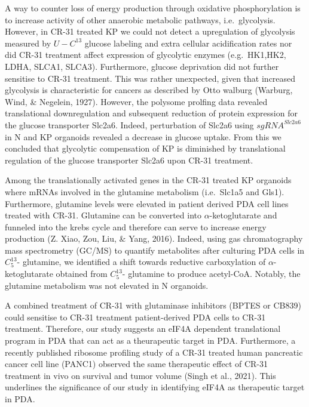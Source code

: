 \documentclass[
  12pt,
  openany]{book}
\begin{document}
A way to counter loss of energy production through oxidative phosphorylation is to increase activity of other anaerobic metabolic pathways, i.e.~glycolysis. However, in CR-31 treated KP we could not detect a upregulation of glycolysis measured by \(U-C^{13}\) glucose labeling and extra cellular acidification rates nor did CR-31 treatment affect expression of glycolytic enzymes (e.g.~HK1,HK2, LDHA, SLCA1, SLCA3). Furthermore, glucose deprivation did not further sensitise to CR-31 treatment. This was rather unexpected, given that increased glycolysis is characteristic for cancers as described by Otto walburg (Warburg, Wind, \& Negelein, 1927). However, the polysome prolfing data revealed translational downregulation and subsequent reduction of protein expression for the glucose transporter Slc2a6. Indeed, perturbation of Slc2a6 using \(sgRNA^{Slc2a6}\) in N and KP organoids revealed a decrease in glucose uptake. From this we concluded that glycolytic compensation of KP is diminished by translational regulation of the glucose transporter Slc2a6 upon CR-31 treatment.

Among the translationally activated genes in the CR-31 treated KP organoids where mRNAs involved in the glutamine metabolism (i.e.~Slc1a5 and Gls1). Furthermore, glutamine levels were elevated in patient derived PDA cell lines treated with CR-31. Glutamine can be converted into \(\alpha\)-ketoglutarate and funneled into the krebs cycle and therefore can serve to increase energy production (Z. Xiao, Zou, Liu, \& Yang, 2016). Indeed, using gas chromatography mass spectrometry (GC/MS) to quantify metabolites after culturing PDA cells in \(C_5^{13}\)- glutamine, we identified a shift towards reductive carboxylation of \(\alpha\)-ketoglutarate obtained from \(C_5^{13}\)- glutamine to produce acetyl-CoA. Notably, the glutamine metabolism was not elevated in N organoids.

A combined treatment of CR-31 with glutaminase inhibitors (BPTES or CB839) could sensitise to CR-31 treatment patient-derived PDA cells to CR-31 treatment. Therefore, our study suggests an eIF4A dependent translational program in PDA that can act as a theurapeutic target in PDA. Furthermore, a recently published ribosome profiling study of a CR-31 treated human pancreatic cancer cell line (PANC1) observed the same therapeutic effect of CR-31 treatment in vivo on survival and tumor volume (Singh et al., 2021). This underlines the significance of our study in identifying eIF4A as therapeutic target in PDA.
\end{document}
